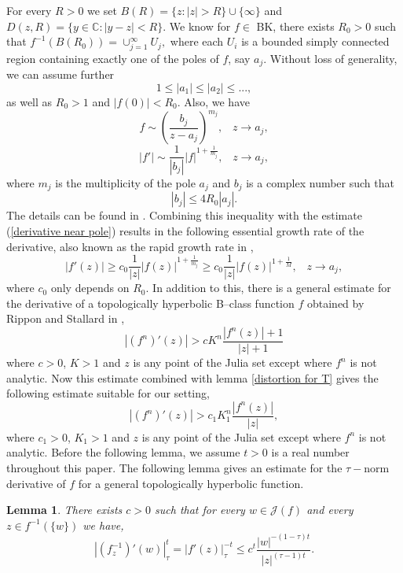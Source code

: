 \documentclass[12pt,reqno]{amsart}
\newtheorem{lemma}[theorem]{Lemma}
\begin{document}
\noindent For every $R>0$ we set $B(R)=\{z: |z|>R \}\cup \{\infty\}$ and 
$D(z,R)=\{ y \in \mathbb{C}: |y-z|<R\}$. We know for $f \in $ BK, there exists $R_0>0$ such that $f^{-1}(B(R_0))=\cup_{j=1}^{\infty} U_j,$
where each $U_i$ is a bounded simply connected region containing exactly one of the poles of $f$, say $a_j$. Without loss of generality, we can assume further
$$1\leq|a_1|\leq|a_2|\leq...,$$
as well as $R_0>1$ and $|f(0)|<R_0$. Also, we have
$$f\sim \left( \frac{b_j}{z-a_j} \right)^{m_j}, \; \; \; z \to a_j,$$
\begin{equation}\label{derivative near pole}
    |f'|\sim  \frac{1}{|b_j|}|f|^{1+\frac{1}{m_j}}, \; \; \; z \to a_j,
\end{equation}
where $m_j$ is the multiplicity of the pole $a_j$ and $b_j$ is a complex number such that
$$|b_j|\leq 4R_0|a_j|.$$
The details can be found in \citep[p. 5374]{Bergweiler-Kotus}. Combining this inequality with the estimate (\ref{derivative near pole}) results in the following essential growth rate of the derivative, also known as the rapid growth rate in \citep[p. 5]{Urbanski-Mayer},
\begin{equation}\label{derivative growth rate}
|f'(z)|\geq c_0\frac{1}{|z|}|f(z)|^{1+\frac{1}{m_j}}\geq c_0\frac{1}{|z|}|f(z)|^{1+\frac{1}{M}}, \; \; \; z \to a_j,
\end{equation}
where $c_0$ only depends on $R_0$. In addition to this, there is a general estimate for the derivative of a topologically hyperbolic B--class function $f$ obtained by Rippon and Stallard in \cite[p. 3252]{stallard},
    \begin{equation}\label{Rippon-Stallard}
        |(f^n)'(z)|>cK^n\dfrac{|f^n(z)|+1}{|z|+1}
    \end{equation}
    where $c>0$, $K>1$ and $z$ is any point of the Julia set except where $f^n$ is not analytic. Now this estimate combined with lemma \ref{distortion for T} gives the following estimate suitable for our setting,
    \begin{equation}\label{Rippon-Stallard-modified}
        |(f^n)'(z)|>c_1K_1^n\dfrac{|f^n(z)|}{|z|},
    \end{equation}
    where $c_1>0$, $K_1>1$ and $z$ is any point of the Julia set except where $f^n$ is not analytic. Before the following lemma, we assume $t>0$ is a real number throughout this paper. The following lemma gives an estimate for the $\tau-$norm derivative of $f$ for a general topologically hyperbolic function.
\begin{lemma}\label{estimate for tau derivative}
    There exists $c>0$ such that for every $w \in \mathcal{J}(f)$ and every $z\in f^{-1}(\{w\})$ we have,
        $$\left|(f_z^{-1})'(w)\right|_{\tau}^{t}=|f'(z)|_{\tau}^{-t} \leq c^{t}\dfrac{|w|^{-(1-\tau)t}}{|z|^{(\tau-1)t}}.$$
\end{lemma}
\end{document}
